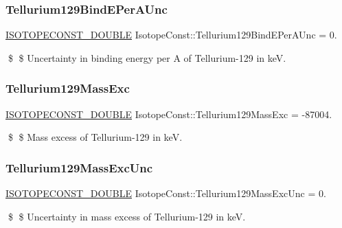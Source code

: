 \subsubsection{\texorpdfstring{Tellurium129\+Bind\+E\+Per\+A\+Unc}{Tellurium129BindEPerAUnc}}
{\footnotesize\ttfamily \mbox{\hyperlink{group___isotope_const-_macros_ga8f45a7272ce02c0b4c65c44636ed719a}{I\+S\+O\+T\+O\+P\+E\+C\+O\+N\+S\+T\+\_\+\+D\+O\+U\+B\+LE}} Isotope\+Const\+::\+Tellurium129\+Bind\+E\+Per\+A\+Unc = 0.}

\$ \$ Uncertainty in binding energy per A of Tellurium-\/129 in keV. \mbox{\label{group___isotope_const-_tellurium-_te129_ga741b46f71c62bb589be784b1e453249e}} 
\subsubsection{\texorpdfstring{Tellurium129\+Mass\+Exc}{Tellurium129MassExc}}
{\footnotesize\ttfamily \mbox{\hyperlink{group___isotope_const-_macros_ga8f45a7272ce02c0b4c65c44636ed719a}{I\+S\+O\+T\+O\+P\+E\+C\+O\+N\+S\+T\+\_\+\+D\+O\+U\+B\+LE}} Isotope\+Const\+::\+Tellurium129\+Mass\+Exc = -\/87004.}

\$ \$ Mass excess of Tellurium-\/129 in keV. \mbox{\label{group___isotope_const-_tellurium-_te129_gae29c6ae5995428c3ab836b8a692aaf4f}} 
\subsubsection{\texorpdfstring{Tellurium129\+Mass\+Exc\+Unc}{Tellurium129MassExcUnc}}
{\footnotesize\ttfamily \mbox{\hyperlink{group___isotope_const-_macros_ga8f45a7272ce02c0b4c65c44636ed719a}{I\+S\+O\+T\+O\+P\+E\+C\+O\+N\+S\+T\+\_\+\+D\+O\+U\+B\+LE}} Isotope\+Const\+::\+Tellurium129\+Mass\+Exc\+Unc = 0.}

\$ \$ Uncertainty in mass excess of Tellurium-\/129 in keV. \mbox{\label{group___isotope_const-_tellurium-_te129_gad8f939dc93685e20353acb4f731f253d}} 
